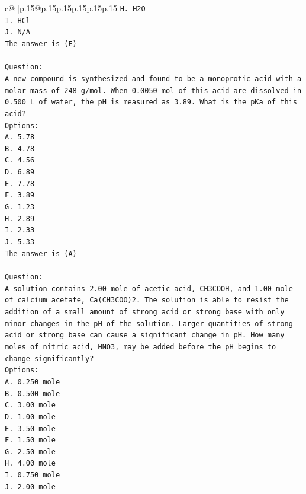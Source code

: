 \documentclass{article}
\begin{document}
{\begin{supertabular}{c@{$\;$}|p{.15\linewidth}@{}p{.15\linewidth}p{.15\linewidth}p{.15\linewidth}p{.15\linewidth}p{.15\linewidth}}
{{{\texttt{H. H2O} \\
\texttt{I. HCl} \\
\texttt{J. N/A} \\
\texttt{The answer is (E)} \\
\\ 
\texttt{Question:} \\
\texttt{A new compound is synthesized and found to be a monoprotic acid with a molar mass of 248 g/mol. When 0.0050 mol of this acid are dissolved in 0.500 L of water, the pH is measured as 3.89. What is the pKa of this acid?} \\
\texttt{Options:} \\
\texttt{A. 5.78} \\
\texttt{B. 4.78} \\
\texttt{C. 4.56} \\
\texttt{D. 6.89} \\
\texttt{E. 7.78} \\
\texttt{F. 3.89} \\
\texttt{G. 1.23} \\
\texttt{H. 2.89} \\
\texttt{I. 2.33} \\
\texttt{J. 5.33} \\
\texttt{The answer is (A)} \\
\\ 
\texttt{Question:} \\
\texttt{A solution contains 2.00 mole of acetic acid, CH3COOH, and 1.00 mole of calcium acetate, Ca(CH3COO)2. The solution is able to resist the addition of a small amount of strong acid or strong base with only minor changes in the pH of the solution. Larger quantities of strong acid or strong base can cause a significant change in pH. How many moles of nitric acid, HNO3, may be added before the pH begins to change significantly?} \\
\texttt{Options:} \\
\texttt{A. 0.250 mole} \\
\texttt{B. 0.500 mole} \\
\texttt{C. 3.00 mole} \\
\texttt{D. 1.00 mole} \\
\texttt{E. 3.50 mole} \\
\texttt{F. 1.50 mole} \\
\texttt{G. 2.50 mole} \\
\texttt{H. 4.00 mole} \\
\texttt{I. 0.750 mole} \\
\texttt{J. 2.00 mole} \\
}}}
\end{supertabular}}
\end{document}
